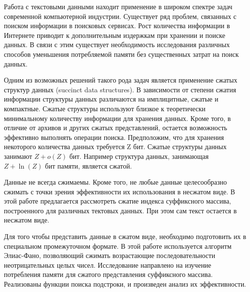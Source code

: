 
Работа с текстовыми данными находит применение в широком спектре задач современной компьютерной индустрии.
Существует ряд проблем, связанных с поиском информации в поисковых сервисах.
Рост количества информации в Интернете приводит к дополнительным издержкам при хранении и поиске данных.
В связи с этим существует необходимость исследования различных способов уменьшения потребляемой памяти без
существенных затрат на поиск данных.


Одним из возможных решений такого рода задач является применение сжатых структур данных (succinct data structures).
В зависимости от степени сжатия информации структуры данных различаются на имплицитные, сжатые и компактные.
Сжатые структуры используют близкое к теоретически минимальному количеству информации для хранения данных.
Кроме того, в отличие от архивов и других сжатых представлений, остается возможность
эффективно выполнять операции поиска.
Предположим, что для хранения некоторого количества данных требуется Z бит.
Сжатые структуры данных занимают \(Z + o(Z)\) бит. Например структура данных, занимающая \(Z + \ln(Z)\) бит памяти,
является сжатой.


Данные не всегда сжимаемы. Кроме того, не любые данные целесообразно сжимать с точки зрения эффективности
их использования в несжатом виде. В этой работе предлагается рассмотреть сжатие индекса суффиксного массива,
построенного для различных тектовых данных. При этом сам текст остается в несжатом виде.


Для того чтобы представить данные в сжатом виде, необходимо подготовить их
в специальном промежуточном формате. В этой работе используется алгоритм Элиас-Фано,
позволяющий сжимать возрастающие последовательности неотрицательных целых чисел.
Исследование направлено на изучение потребления памяти для сжатого представления суффиксного массива.
Реализованы функции поиска подстроки, и произведен анализ их эффективности.

